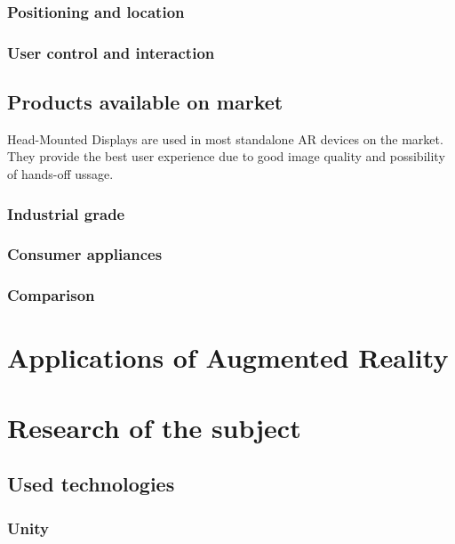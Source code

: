 \documentclass[printmode,en]{mgr}
\begin{document}
\subsection{Positioning and location}
\subsection{User control and interaction}

\section{Products available on market}
Head-Mounted Displays are used in most standalone AR devices on the market. They provide the best user experience due to good image quality and possibility of hands-off ussage.

\subsection{Industrial grade}

\subsection{Consumer appliances}

\subsection{Comparison}

\chapter{Applications of Augmented Reality}


\chapter{Research of the subject}

\section{Used technologies}

\subsection{Unity}
\end{document}
